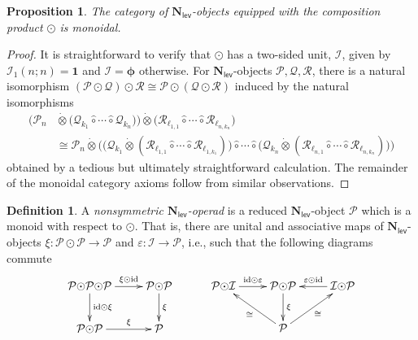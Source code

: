 \documentclass[11pt]{amsart}
\newtheorem{proposition}[subsection]{Proposition}
\theoremstyle{definition}
\newtheorem{definition}[subsection]{Definition}
\theoremstyle{remark}
\newcommand{\id}{\mathrm{id}}
\newcommand{\Cal}[1]{\mathcal{#1}}
\newcommand{\circhat}{\hat{\circ}}
\newcommand{\circdot}{{\odot}}
\newcommand{\tensordot}{\dot{\otimes}}
\newcommand{\Nl}{\mathbf{N}_{\mathsf{lev}}}
\newcommand{\ptC}{\pmb{\phi}}
\begin{document}
\begin{proposition} \label{N_l-monoidal}
The category of $\Nl$-objects equipped with the composition product $\circdot$ is monoidal.
\end{proposition}

\begin{proof}
It is straightforward to verify that $\circdot$ has a two-sided unit, $\mathcal{I}$, given by $\mathcal{I}_1(n;n)=\mathbf{1}$ and $\Cal{I}=\ptC$ otherwise. For $\Nl$-objects $\Cal{P},\Cal{Q},\Cal{R}$, there is a natural isomorphism $(\Cal{P}\circdot \Cal{Q})\circdot \Cal{R}\cong \Cal{P}\circdot (\Cal{Q}\circdot \Cal{R})$ induced by the natural isomorphisms \begin{align} \label{asoc-circdot}
\Big( \Cal{P}_n &\tensordot \big(\Cal{Q}_{k_1}\circhat \cdots \circhat \Cal{Q}_{k_n}\big)\Big)\tensordot \big(\Cal{R}_{\ell_{1,1}}\circhat \cdots \circhat \Cal{R}_{\ell_{n,k_n}}\big) 
\\
&\cong \Cal{P}_n \tensordot \Big( \big(\Cal{Q}_{k_1} \tensordot (\Cal{R}_{\ell_{1,1}}\circhat \cdots \circhat \Cal{R}_{\ell_{1,k_1}}) \big) \circhat \cdots \circhat \big(\Cal{Q}_{k_n} \tensordot (\Cal{R}_{\ell_{n,1}}\circhat \cdots \circhat \Cal{R}_{\ell_{n,k_n}}) \big)\Big) \nonumber
\end{align}
obtained by a tedious but ultimately straightforward calculation. The remainder of the monoidal category axioms follow from similar observations. 
\end{proof}

\begin{definition} 
A \textit{nonsymmetric $\Nl$-operad} is a reduced $\Nl$-object $\Cal{P}$ which is a monoid with respect to $\circdot$. That is, there are unital and associative maps of $\Nl$-objects $\xi\colon \Cal{P}\circdot \Cal{P}\to\Cal{P}$ and $\varepsilon\colon \Cal{I}\to \Cal{P}$, i.e., such that the following diagrams commute \[ \xymatrix{ \Cal{P}\circdot \Cal{P} \circdot \Cal{P} \ar[r]^-{\xi\circdot\id} \ar[d]^-{\id\circdot \xi}& \Cal{P}\circdot \Cal{P} \ar[d]^-{\xi} \\ \Cal{P}\circdot \Cal{P} \ar[r]^-{\xi} & \Cal{P}} \hspace{1cm} \xymatrix{ \Cal{P} \circdot \Cal{I} \ar[r]^-{\id\circdot \varepsilon} & \Cal{P}\circdot \Cal{P} \ar[d]^-{\xi} & \Cal{I} \circdot \Cal{P} \ar[l]_-{\varepsilon \circdot \id} \\ & \Cal{P} \ar[ul]^-{\cong} \ar[ur]_{\cong} }\]
\end{definition}

\end{document}

